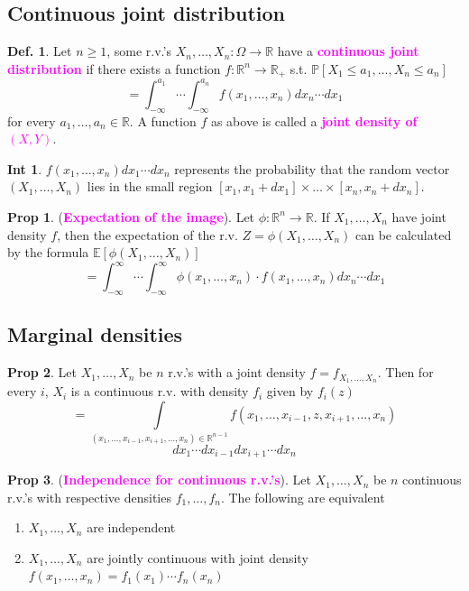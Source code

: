 \documentclass[8pt,a4paper,landscape]{article}
\theoremstyle{definition}
\newtheorem{definition}{Def.}[section]
\theoremstyle{example}
\theoremstyle{intuition}
\newtheorem*{intuition}{Int}
\theoremstyle{definition}
\newtheorem{proposition}{Prop}[section]
\newcommand{\mydef}[1]{\textcolor{magenta}{\textbf{#1}}}
\newcommand{\prob}[1]{\mathbb{P}\left[ #1 \right]}
\newcommand{\expec}[1]{\mathbb{E}\left[ #1 \right]}
\begin{document}
\begin{multicols}{3}
		\subsection{Continuous joint distribution}
			\begin{definition}
				Let $n \geq 1$, some r.v.'s $X_n, \ldots, X_n : \Omega \to \mathbb{R}$ have a \mydef{continuous joint distribution} if there exists a function $f : \mathbb{R}^n \to \mathbb{R}_+$ s.t. $\prob{X_1 \leq a_1, \ldots, X_n \leq a_n}$
				$$
				 = \int_{-\infty}^{a_1} \cdots \int_{-\infty}^{a_n} f(x_1, \ldots, x_n)dx_n \cdots dx_1
				$$
				for every $a_1, \ldots, a_n \in \mathbb{R}$. A function $f$ as above is called a \mydef{joint density of $(X,Y)$}.
			\end{definition}

			\begin{intuition}
				$f(x_1, \ldots, x_n)dx_1 \cdots dx_n$ represents the probability that the random vector $(X_1, \ldots, X_n)$ lies in the small region $\left[x_1, x_1 + dx_1\right] \times \ldots \times \left[x_n, x_n + dx_n\right]$.  
			\end{intuition}

			\begin{proposition}
				(\mydef{Expectation of the image}).
				Let $\phi : \mathbb{R}^n \to \mathbb{R}$. If $X_1, \ldots, X_n$ have joint density $f$, then the expectation of the r.v. $Z = \phi(X_1, \ldots, X_n)$ can be calculated by the formula $\expec{\phi(X_1, \ldots, X_n)}$
				$$
					= \int_{-\infty}^\infty \cdots \int_{-\infty}^\infty \phi(x_1, \ldots, x_n) \cdot f(x_1, \ldots, x_n) dx_n \cdots dx_1
				$$
			\end{proposition}


		\subsection{Marginal densities}
			\begin{proposition}
				Let $X_1, \ldots, X_n$ be $n$ r.v.'s with a joint density $f = f_{X_1, \ldots, X_n}$. Then for every $i$, $X_i$ is a continuous r.v. with density $f_i$ given by $f_i(z)$
				$$
				= \int\limits_{(x_1, \ldots, x_{i-1}, x_{i+1}, \ldots, x_n) \in \mathbb{R}^{n-1}}
						f(x_1, \ldots, x_{i-1}, z, x_{i+1}, \ldots, x_n) 
				$$
				$$
					dx_1 \cdots dx_{i-1} dx_{i+1} \cdots dx_n
				$$
			\end{proposition}

			\begin{proposition}
				(\mydef{Independence for continuous r.v.'s}).
				Let $X_1, \ldots, X_n$ be $n$ continuous r.v.'s with respective densities $f_1, \ldots, f_n$. The following are equivalent
				\begin{enumerate}[label=\roman*.]
					\item $X_1, \ldots, X_n$ are independent
					\item $X_1, \ldots, X_n$ are jointly continuous with joint density $f(x_1, \ldots, x_n) = f_1(x_1) \cdots f_n(x_n)$
				\end{enumerate}
			\end{proposition}



\end{multicols}
\end{document}
